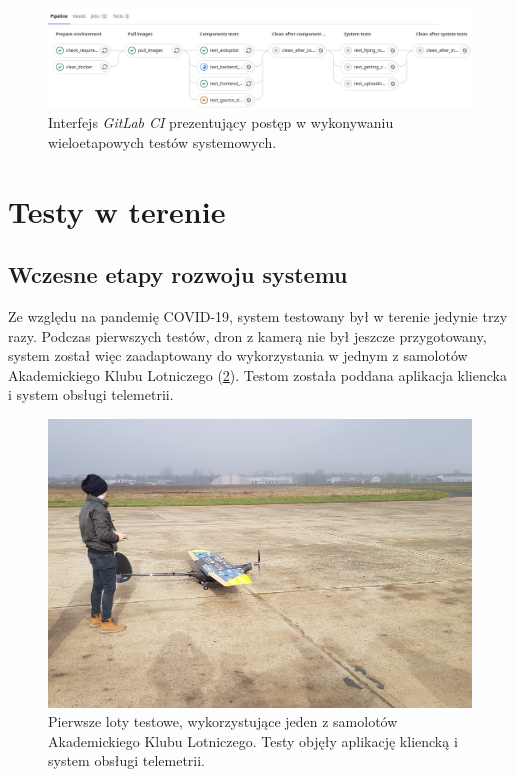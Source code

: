 \begin{figure}[H]
	\centering
	\includegraphics[width=\linewidth]{rys05/pipeline.png}
    \caption{
        Interfejs \textit{GitLab CI} prezentujący postęp w wykonywaniu
        wieloetapowych testów systemowych.
    }
	\label{pipeline_gitlab_ci}
\end{figure}

\section{Testy w terenie}

\subsection{Wczesne etapy rozwoju systemu} \label{early_tests}

Ze względu na pandemię COVID-19, system testowany był w terenie jedynie trzy razy.
Podczas pierwszych testów, dron z kamerą nie był jeszcze przygotowany, system został więc 
zaadaptowany do wykorzystania w jednym z samolotów Akademickiego Klubu Lotniczego (\ref{test_sae}).
Testom została poddana aplikacja kliencka i system obsługi telemetrii.

\begin{figure}[H]
	\centering
	\includegraphics[width=0.8\linewidth]{rys05/test_sae.jpg}
    \caption{
        Pierwsze loty testowe, wykorzystujące jeden z samolotów Akademickiego
        Klubu Lotniczego. Testy objęły aplikację kliencką i system obsługi telemetrii.
    }
	\label{test_sae}
\end{figure}


